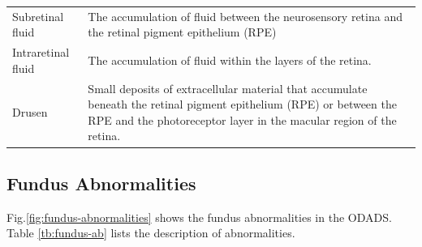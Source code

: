 \documentclass{article}
\begin{document}
{{\begin{longtable}{lp{3.8in}}
				\multicolumn{1}{l}{Subretinal fluid}
				&  The accumulation of fluid between the neurosensory retina and the retinal pigment epithelium (RPE)\\

				\multicolumn{1}{l}{Intraretinal fluid}
				& The accumulation of fluid within the layers of the retina.\\
				
				\multicolumn{1}{l}{Drusen}
				& Small deposits of extracellular material that accumulate beneath the retinal pigment epithelium (RPE) or between the RPE and the photoreceptor layer in the macular region of the retina.\\

				\bottomrule
				\end{longtable}
			}
		}
	
	\subsection{Fundus Abnormalities}
	
	Fig.\ref{fig:fundus-abnormalities} shows the fundus abnormalities in the ODADS.
	Table \ref{tb:fundus-ab} lists the description of abnormalities.
	
\end{document}
